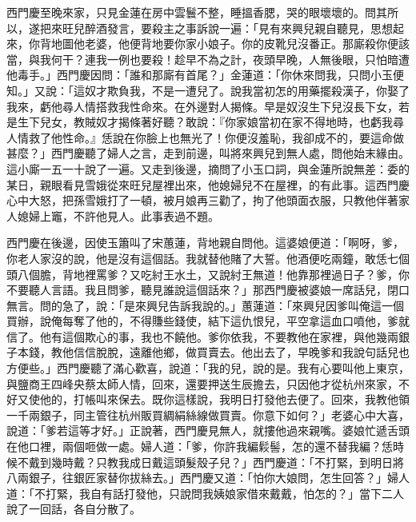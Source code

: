 西門慶至晚來家，只見金蓮在房中雲鬟不整，睡搵香腮，哭的眼壞壞的。問其所以，遂把來旺兒醉酒發言，要殺主之事訴說一遍：「見有來興兒親自聽見，思想起來，你背地圖他老婆，他便背地要你家小娘子。你的皮靴兒沒番正。那廝殺你便該當，與我何干？連我一例也要殺！趁早不為之計，夜頭早晚，人無後眼，只怕暗遭他毒手。」西門慶因問：「誰和那廝有首尾？」金蓮道：「你休來問我，只問小玉便知。」又說：「這奴才欺負我，不是一遭兒了。說我當初怎的用藥擺殺漢子，你娶了我來，虧他尋人情搭救我性命來。在外邊對人揭條。早是奴沒生下兒沒長下女，若是生下兒女，教賊奴才揭條著好聽？敢說：『你家娘當初在家不得地時，也虧我尋人情救了他性命。』恁說在你臉上也無光了！你便沒羞恥，我卻成不的，要這命做甚麼？」西門慶聽了婦人之言，走到前邊，叫將來興兒到無人處，問他始末緣由。這小廝一五一十說了一遍。又走到後邊，摘問了小玉口詞，與金蓮所說無差：委的某日，親眼看見雪娥從來旺兒屋裡出來，他媳婦兒不在屋裡，的有此事。這西門慶心中大怒，把孫雪娥打了一頓，被月娘再三勸了，拘了他頭面衣服，只教他伴著家人媳婦上竈，不許他見人。此事表過不題。

西門慶在後邊，因使玉簫叫了宋蕙蓮，背地親自問他。這婆娘便道：「啊呀，爹，你老人家沒的說，他是沒有這個話。我就替他賭了大誓。他酒便吃兩鐘，敢恁七個頭八個膽，背地裡罵爹？又吃紂王水土，又說紂王無道！他靠那裡過日子？爹，你不要聽人言語。我且問爹，聽見誰說這個話來？」那西門慶被婆娘一席話兒，閉口無言。問的急了，說：「是來興兒告訴我說的。」蕙蓮道：「來興兒因爹叫俺這一個買辦，說俺每奪了他的，不得賺些錢使，結下這仇恨兒，平空拿這血口噴他，爹就信了。他有這個欺心的事，我也不饒他。爹你依我，不要教他在家裡，與他幾兩銀子本錢，教他信信脫脫，遠離他鄉，做買賣去。他出去了，早晚爹和我說句話兒也方便些。」西門慶聽了滿心歡喜，說道：「我的兒，說的是。我有心要叫他上東京，與鹽商王四峰央蔡太師人情，回來，還要押送生辰擔去，只因他才從杭州來家，不好又使他的，打帳叫來保去。既你這樣說，我明日打發他去便了。回來，我教他領一千兩銀子，同主管往杭州販買綢絹絲線做買賣。你意下如何？」老婆心中大喜，說道：「爹若這等才好。」正說著，西門慶見無人，就摟他過來親嘴。婆娘忙遞舌頭在他口裡，兩個咂做一處。婦人道：「爹，你許我編鬏髻，怎的還不替我編？恁時候不戴到幾時戴？只教我成日戴這頭髮殼子兒？」西門慶道：「不打緊，到明日將八兩銀子，往銀匠家替你拔絲去。」西門慶又道：「怕你大娘問，怎生回答？」婦人道：「不打緊，我自有話打發他，只說問我姨娘家借來戴戴，怕怎的？」當下二人說了一回話，各自分散了。

